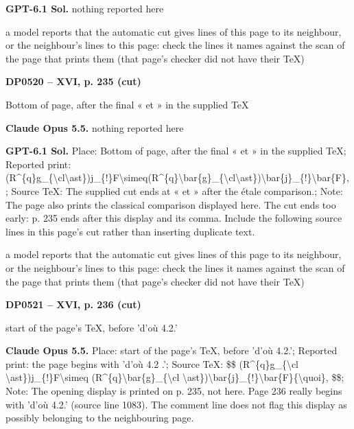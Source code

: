 \textbf{GPT-6.1 Sol.} nothing reported here\par
a model reports that the automatic cut gives lines of this page to its neighbour, or the neighbour's lines to this page: check the lines it names against the scan of the page that prints them (that page's checker did not have their TeX)\par
\par\noindent\hypertarget{DP0520}{}\textbf{DP0520 -- XVI, p. 235 (cut)}\par
Bottom of page, after the final « et » in the supplied TeX\par
\textbf{Claude Opus 5.5.} nothing reported here\par
\textbf{GPT-6.1 Sol.} Place: Bottom of page, after the final « et » in the supplied TeX; Reported print: (R\textasciicircum{}\{q\}g\_\{\textbackslash{}cl\textbackslash{}ast\})j\_\{!\}F\textbackslash{}simeq(R\textasciicircum{}\{q\}\textbackslash{}bar\{g\}\_\{\textbackslash{}cl\textbackslash{}ast\})\textbackslash{}bar\{j\}\_\{!\}\textbackslash{}bar\{F\},; Source TeX: The supplied cut ends at « et » after the étale comparison.; Note: The page also prints the classical comparison displayed here. The cut ends too early: p. 235 ends after this display and its comma. Include the following source lines in this page's cut rather than inserting duplicate text.\par
a model reports that the automatic cut gives lines of this page to its neighbour, or the neighbour's lines to this page: check the lines it names against the scan of the page that prints them (that page's checker did not have their TeX)\par
\par\noindent\hypertarget{DP0521}{}\textbf{DP0521 -- XVI, p. 236 (cut)}\par
start of the page's TeX, before 'd'où 4.2.'\par
\textbf{Claude Opus 5.5.} Place: start of the page's TeX, before 'd'où 4.2.'; Reported print: the page begins with 'd'où 4.2 .'; Source TeX: \$\$ (R\textasciicircum{}\{q\}g\_\{\textbackslash{}cl \textbackslash{}ast\})j\_\{!\}F\textbackslash{}simeq (R\textasciicircum{}\{q\}\textbackslash{}bar\{g\}\_\{\textbackslash{}cl \textbackslash{}ast\})\textbackslash{}bar\{j\}\_\{!\}\textbackslash{}bar\{F\}\{\textbackslash{}quoi\}, \$\$; Note: The opening display is printed on p. 235, not here. Page 236 really begins with 'd'où 4.2.' (source line 1083). The comment line does not flag this display as possibly belonging to the neighbouring page.\par
